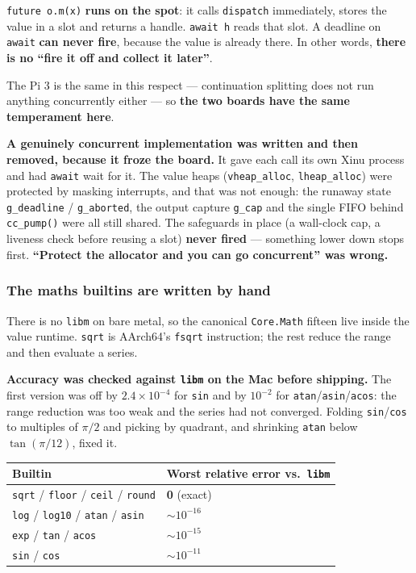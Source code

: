 \documentclass[11pt,a4paper]{article}
\begin{document}
\texttt{future o.m(x)} \textbf{runs on the spot}: it calls \texttt{dispatch}
immediately, stores the value in a slot and returns a handle. \texttt{await h}
reads that slot. A deadline on \texttt{await} \textbf{can never fire}, because
the value is already there. In other words, \textbf{there is no ``fire it off
and collect it later''}.

The Pi 3 is the same in this respect --- continuation splitting does not run
anything concurrently either --- so \textbf{the two boards have the same
temperament here}.

\textbf{A genuinely concurrent implementation was written and then removed,
because it froze the board.} It gave each call its own Xinu process and had
\texttt{await} wait for it. The value heaps (\texttt{vheap\_alloc},
\texttt{lheap\_alloc}) were protected by masking interrupts, and that was not
enough: the runaway state \texttt{g\_deadline} / \texttt{g\_aborted}, the output
capture \texttt{g\_cap} and the single FIFO behind \texttt{cc\_pump()} were all
still shared. The safeguards in place (a wall-clock cap, a liveness check
before reusing a slot) \textbf{never fired} --- something lower down stops
first. \textbf{``Protect the allocator and you can go concurrent'' was wrong.}

\subsubsection*{The maths builtins are written by hand}
\label{sec:hw-math}

There is no \texttt{libm} on bare metal, so the canonical \texttt{Core.Math}
fifteen live inside the value runtime. \texttt{sqrt} is AArch64's \texttt{fsqrt}
instruction; the rest reduce the range and then evaluate a series.

\textbf{Accuracy was checked against \texttt{libm} on the Mac before shipping.}
The first version was off by $2.4\times10^{-4}$ for \texttt{sin} and by
$10^{-2}$ for \texttt{atan}/\texttt{asin}/\texttt{acos}: the range reduction was
too weak and the series had not converged. Folding \texttt{sin}/\texttt{cos} to
multiples of $\pi/2$ and picking by quadrant, and shrinking \texttt{atan} below
$\tan(\pi/12)$, fixed it.

\begin{center}
\small
\begin{tabular}{@{}ll@{}}
\toprule
Builtin & Worst relative error vs.\ \texttt{libm} \\
\midrule
\texttt{sqrt} / \texttt{floor} / \texttt{ceil} / \texttt{round} & \textbf{0} (exact) \\
\texttt{log} / \texttt{log10} / \texttt{atan} / \texttt{asin} & $\sim 10^{-16}$ \\
\texttt{exp} / \texttt{tan} / \texttt{acos} & $\sim 10^{-15}$ \\
\texttt{sin} / \texttt{cos} & $\sim 10^{-11}$ \\
\bottomrule
\end{tabular}
\end{center}
\end{document}
